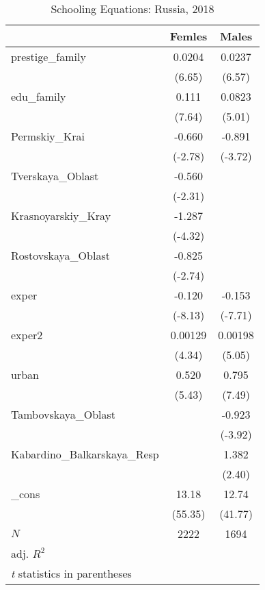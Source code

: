 \begin{table}[htbp]\centering
\caption{Schooling Equations: Russia, 2018}
\begin{tabular}{l*{2}{c}}
\hline\hline
          &\multicolumn{1}{c}{Femles}&\multicolumn{1}{c}{Males}\\
\hline
prestige\_family&   0.0204&   0.0237\\
          &   (6.65)&   (6.57)\\
edu\_family&    0.111&   0.0823\\
          &   (7.64)&   (5.01)\\
Permskiy\_Krai&   -0.660&   -0.891\\
          &  (-2.78)&  (-3.72)\\
Tverskaya\_Oblast&   -0.560&         \\
          &  (-2.31)&         \\
Krasnoyarskiy\_Kray&   -1.287&         \\
          &  (-4.32)&         \\
Rostovskaya\_Oblast&   -0.825&         \\
          &  (-2.74)&         \\
exper     &   -0.120&   -0.153\\
          &  (-8.13)&  (-7.71)\\
exper2    &  0.00129&  0.00198\\
          &   (4.34)&   (5.05)\\
urban     &    0.520&    0.795\\
          &   (5.43)&   (7.49)\\
Tambovskaya\_Oblast&         &   -0.923\\
          &         &  (-3.92)\\
Kabardino\_Balkarskaya\_Resp&         &    1.382\\
          &         &   (2.40)\\
\_cons    &    13.18&    12.74\\
          &  (55.35)&  (41.77)\\
\hline
\(N\)     &     2222&     1694\\
adj. \(R^{2}\)&         &         \\
\hline\hline
\multicolumn{3}{l}{\footnotesize \textit{t} statistics in parentheses}\\
\end{tabular}
\end{table}
